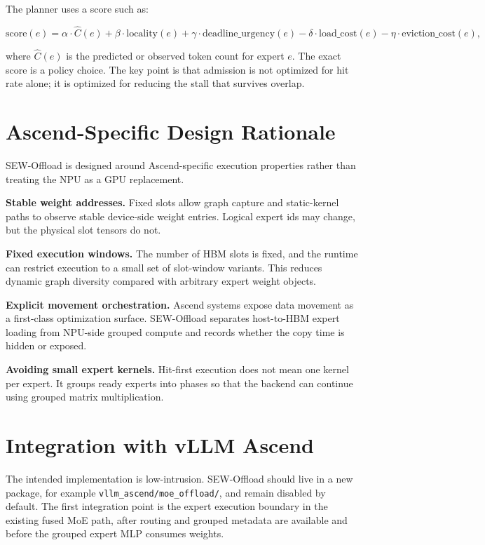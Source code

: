 \documentclass[10pt]{article}
\begin{document}
The planner uses a score such as:

\begin{equation}
\text{score}(e) =
\alpha \cdot \widehat{C}(e)
+ \beta \cdot \text{locality}(e)
+ \gamma \cdot \text{deadline\_urgency}(e)
- \delta \cdot \text{load\_cost}(e)
- \eta \cdot \text{eviction\_cost}(e),
\end{equation}

where $\widehat{C}(e)$ is the predicted or observed token count for expert
$e$. The exact score is a policy choice. The key point is that admission is
not optimized for hit rate alone; it is optimized for reducing the stall that
survives overlap.

\section{Ascend-Specific Design Rationale}

SEW-Offload is designed around Ascend-specific execution properties rather than
treating the NPU as a GPU replacement.

\textbf{Stable weight addresses.}
Fixed slots allow graph capture and static-kernel paths to observe stable
device-side weight entries. Logical expert ids may change, but the physical
slot tensors do not.

\textbf{Fixed execution windows.}
The number of HBM slots is fixed, and the runtime can restrict execution to a
small set of slot-window variants. This reduces dynamic graph diversity
compared with arbitrary expert weight objects.

\textbf{Explicit movement orchestration.}
Ascend systems expose data movement as a first-class optimization surface.
SEW-Offload separates host-to-HBM expert loading from NPU-side grouped compute
and records whether the copy time is hidden or exposed.

\textbf{Avoiding small expert kernels.}
Hit-first execution does not mean one kernel per expert. It groups ready
experts into phases so that the backend can continue using grouped matrix
multiplication.

\section{Integration with vLLM Ascend}

The intended implementation is low-intrusion. SEW-Offload should live in a new
package, for example \texttt{vllm\_ascend/moe\_offload/}, and remain disabled by
default. The first integration point is the expert execution boundary in the
existing fused MoE path, after routing and grouped metadata are available and
before the grouped expert MLP consumes weights.
\end{document}
